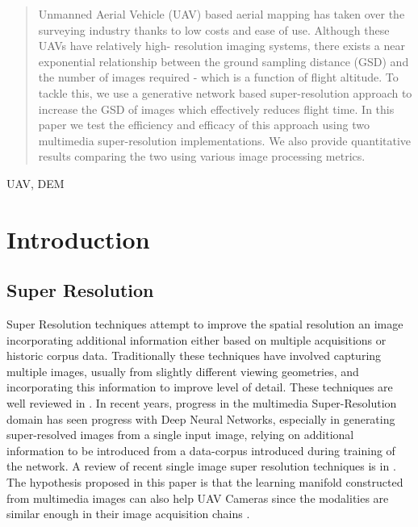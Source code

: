 \documentclass[conference]{IEEEtran}
\begin{document}
\maketitle

\begin{abstract}
    Unmanned Aerial Vehicle (UAV) based aerial mapping has
    taken over the surveying industry thanks to low costs and
    ease of use. Although these UAVs have relatively high-
    resolution imaging systems, there exists a near exponential
    relationship between the ground sampling distance (GSD)
    and the number of images required - which is a function of
    flight altitude. To tackle this, we use a generative network
    based super-resolution approach to increase the GSD of
    images which effectively reduces flight time. In this paper
    we test the efficiency and efficacy of this approach using
    two multimedia super-resolution implementations. We also
    provide quantitative results comparing the two using various
    image processing metrics.
\end{abstract}

\begin{IEEEkeywords}
UAV, DEM
\end{IEEEkeywords}

\section{Introduction}
\subsection{Super Resolution}
Super Resolution techniques attempt to improve the spatial
resolution an image incorporating additional information
either based on multiple acquisitions or historic corpus data.
Traditionally these techniques have involved capturing
multiple images, usually from slightly different viewing
geometries, and incorporating this information to improve
level of detail. These techniques are well reviewed in \cite{yue2016image}.
In recent years, progress in the multimedia Super-Resolution
domain has seen progress with Deep Neural Networks,
especially in generating super-resolved images from a single
input image, relying on additional information to be
introduced from a data-corpus introduced during training of
the network. A review of recent single image super
resolution techniques is in \cite{bashir2021comprehensive}. \\
The hypothesis proposed in this paper is that the learning
manifold constructed from multimedia images can also help
UAV Cameras since the modalities are similar enough in
their image acquisition chains \cite{cramer2017uav}.
\end{document}
